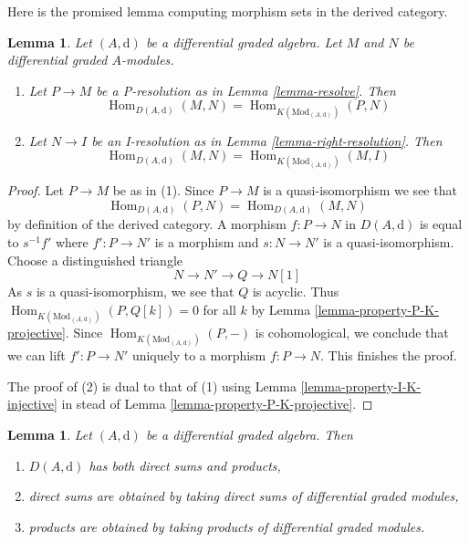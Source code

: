 \documentclass{stacks-project}
\theoremstyle{plain}
\newtheorem{lemma}[subsection]{Lemma}
\theoremstyle{definition}
\theoremstyle{remark}
\numberwithin{equation}{subsection}
\def\Hom{\mathop{\mathrm{Hom}}\nolimits}
\begin{document}
\noindent
Here is the promised lemma computing morphism sets in the
derived category.

\begin{lemma}
\label{lemma-hom-derived}
Let $(A, \text{d})$ be a differential graded algebra.
Let $M$ and $N$ be differential graded $A$-modules.
\begin{enumerate}
\item Let $P \to M$ be a P-resolution as in
Lemma \ref{lemma-resolve}. Then
$$
\Hom_{D(A, \text{d})}(M, N) =
\Hom_{K(\text{Mod}_{(A, \text{d})})}(P, N)
$$
\item Let $N \to I$ be an I-resolution as in
Lemma \ref{lemma-right-resolution}. Then
$$
\Hom_{D(A, \text{d})}(M, N) =
\Hom_{K(\text{Mod}_{(A, \text{d})})}(M, I)
$$
\end{enumerate}
\end{lemma}

\begin{proof}
Let $P \to M$ be as in (1). Since $P \to M$ is a quasi-isomorphism we see that
$$
\Hom_{D(A, \text{d})}(P, N) = \Hom_{D(A, \text{d})}(M, N)
$$
by definition of the derived category. A morphism
$f : P \to N$ in $D(A, \text{d})$ is equal to
$s^{-1}f'$ where $f' : P \to N'$ is a morphism and
$s : N \to N'$ is a quasi-isomorphism. Choose a distinguished triangle
$$
N \to N' \to Q \to N[1]
$$
As $s$ is a quasi-isomorphism, we see that $Q$ is acyclic. Thus
$\Hom_{K(\text{Mod}_{(A, \text{d})})}(P, Q[k]) = 0$ for all $k$ by
Lemma \ref{lemma-property-P-K-projective}. Since
$\Hom_{K(\text{Mod}_{(A, \text{d})})}(P, -)$
is cohomological, we conclude that we can lift $f' : P \to N'$
uniquely to a morphism $f : P \to N$. This finishes the proof.

\medskip\noindent
The proof of (2) is dual to that of (1) using
Lemma \ref{lemma-property-I-K-injective} in stead of
Lemma \ref{lemma-property-P-K-projective}.
\end{proof}

\begin{lemma}
\label{lemma-derived-products}
Let $(A, \text{d})$ be a differential graded algebra. Then
\begin{enumerate}
\item $D(A, \text{d})$ has both direct sums and products,
\item direct sums are obtained by taking direct sums of differential graded
modules,
\item products are obtained by taking products of differential
graded modules.
\end{enumerate}
\end{lemma}
\end{document}
